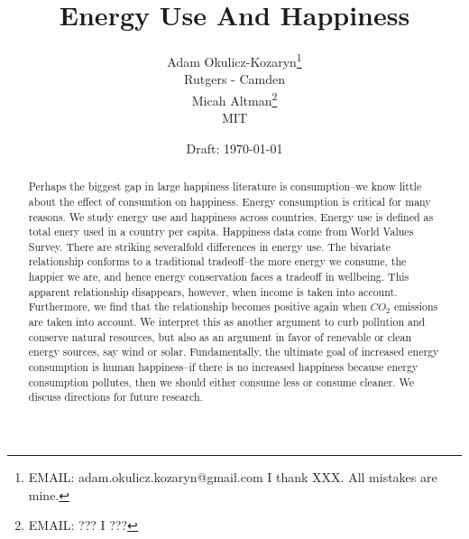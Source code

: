 \documentclass[10pt, letterpaper]{article}
\date{Draft: {}\today}
\title{
Energy Use And Happiness
}
\author{
Adam Okulicz-Kozaryn\thanks{EMAIL: adam.okulicz.kozaryn@gmail.com
  \hfill I thank XXX.  All mistakes are mine.} \\
{\small Rutgers - Camden}\\
Micah Altman\thanks{EMAIL: ???
  \hfill I ???} \\


{\small MIT}
}
\begin{document}

%
\maketitle
\vspace{-.4in}
\begin{center}

\end{center}

\begin{abstract}
\noindent Perhaps the biggest gap in large happiness literature is
consumption--we know little about the effect of consumtion on happiness. Energy
consumption is critical for many reasons.  We study energy use and happiness across countries.  Energy
use is defined as total enery used in a country per capita. Happiness data come
 from World Values Survey. There are striking severalfold differences in
energy use. The bivariate relationship conforms to a traditional tradeoff--the
more energy we consume, the happier we are, and hence energy conservation faces
a tradeoff in wellbeing. This apparent relationship disappears, however, when
income is taken into account. Furthermore, we find that the relationship becomes
positive again when $CO_2$ emissions are taken into account. We interpret this
 as another argument to curb pollution and conserve natural resources, but also
 as an argument in favor of renevable or clean energy sources, say wind or solar.  %
 Fundamentally, the ultimate goal of increased energy consumption is human
 happiness--if there is no increased happiness because energy consumption
 pollutes, then we should either consume less or consume cleaner. We discuss directions for future research.
\end{abstract}




\vspace{.15in} 
\end{document}
